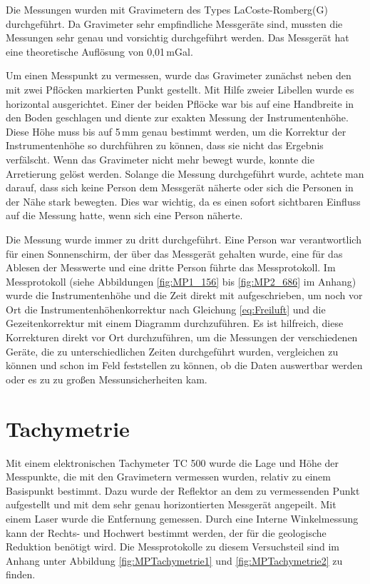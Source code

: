 Die Messungen wurden mit Gravimetern des Types LaCoste-Romberg(G) durchgeführt. Da Gravimeter sehr empfindliche Messgeräte sind, mussten die Messungen sehr genau und vorsichtig durchgeführt werden. Das Messgerät hat eine 
theoretische Auflösung von 0,01\,mGal.

Um einen Messpunkt zu vermessen, wurde das Gravimeter zunächst neben den mit zwei Pflöcken markierten Punkt gestellt. Mit Hilfe zweier Libellen wurde es horizontal ausgerichtet. Einer der beiden Pflöcke 
war bis auf eine Handbreite in den Boden geschlagen und diente zur exakten Messung der Instrumentenhöhe. Diese Höhe muss bis auf 5\,mm genau bestimmt werden, um die Korrektur der Instrumentenhöhe so durchführen zu können, dass sie nicht das Ergebnis verfälscht.
Wenn das Gravimeter nicht mehr bewegt wurde, konnte die Arretierung gelöst werden. Solange die Messung durchgeführt wurde, achtete man darauf, dass sich keine Person dem Messgerät näherte oder sich die Personen in der Nähe stark bewegten. Dies war wichtig, da es einen sofort sichtbaren Einfluss auf die Messung hatte, wenn sich eine Person näherte.

Die Messung wurde immer zu dritt durchgeführt. Eine Person war verantwortlich für einen Sonnenschirm, der über das Messgerät gehalten wurde, eine für das Ablesen der Messwerte 
und eine dritte Person führte das Messprotokoll. Im Messprotokoll (siehe Abbildungen \ref{fig:MP1_156} bis \ref{fig:MP2_686} im Anhang) wurde die Instrumentenhöhe und die Zeit direkt mit aufgeschrieben, um noch vor Ort die Instrumentenhöhenkorrektur nach Gleichung \eqref{eq:Freiluft} und die Gezeitenkorrektur mit einem Diagramm durchzuführen.
Es ist hilfreich, diese Korrekturen direkt vor Ort durchzuführen, um die Messungen der verschiedenen Geräte, die zu unterschiedlichen Zeiten durchgeführt wurden, vergleichen zu können und schon im Feld feststellen zu können, ob die Daten auswertbar werden oder es zu zu großen Messunsicherheiten kam.

\section{Tachymetrie}

Mit einem elektronischen Tachymeter TC 500 wurde die Lage und Höhe der Messpunkte, die mit den Gravimetern vermessen wurden, relativ zu einem Basispunkt bestimmt. Dazu wurde der Reflektor an dem zu vermessenden Punkt aufgestellt und mit dem sehr genau horizontierten Messgerät angepeilt. Mit einem Laser wurde die Entfernung gemessen. Durch eine Interne Winkelmessung kann der Rechts- und Hochwert bestimmt werden, der für die geologische Reduktion benötigt wird. Die Messprotokolle zu diesem Versuchsteil sind im Anhang unter Abbildung \ref{fig:MPTachymetrie1} und \ref{fig:MPTachymetrie2} zu finden.

